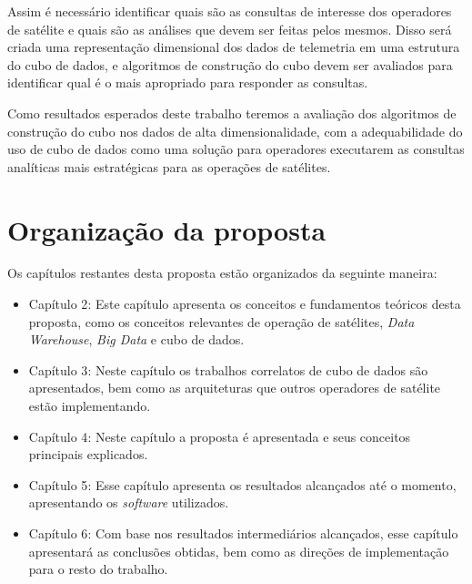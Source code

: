 Assim é necessário identificar quais são as consultas de interesse dos operadores de satélite e quais são as análises que devem ser feitas pelos mesmos.
Disso será criada uma representação dimensional dos dados de telemetria em uma estrutura do cubo de dados, e  algoritmos de construção do cubo devem ser avaliados para identificar qual é o mais apropriado para responder as consultas.

Como resultados esperados deste trabalho teremos a avaliação dos algoritmos de construção do cubo nos dados de alta dimensionalidade, com a adequabilidade do uso de cubo de dados como uma solução para operadores executarem as consultas analíticas mais estratégicas para as operações de satélites.

\section{Organização da proposta}\label{ch:intro:org}

Os capítulos restantes desta proposta estão organizados da seguinte maneira:

\begin{itemize}
	\item{Capítulo 2}: Este capítulo apresenta os conceitos e fundamentos teóricos desta proposta, como os conceitos relevantes de operação de satélites, \textit{Data Warehouse}, \textit{Big Data} e cubo de dados.
	\item{Capítulo 3}: Neste capítulo os trabalhos correlatos de cubo de dados são apresentados, bem como as arquiteturas que outros operadores de satélite estão implementando.
	\item{Capítulo 4}: Neste capítulo a proposta é apresentada e seus conceitos principais explicados.
  \item{Capítulo 5}: Esse capítulo apresenta os resultados alcançados até o momento, apresentando os \textit{software} utilizados.
	\item{Capítulo 6}: Com base nos resultados intermediários alcançados, esse capítulo apresentará as conclusões obtidas, bem como as direções de implementação para o resto do trabalho.
\end{itemize}

